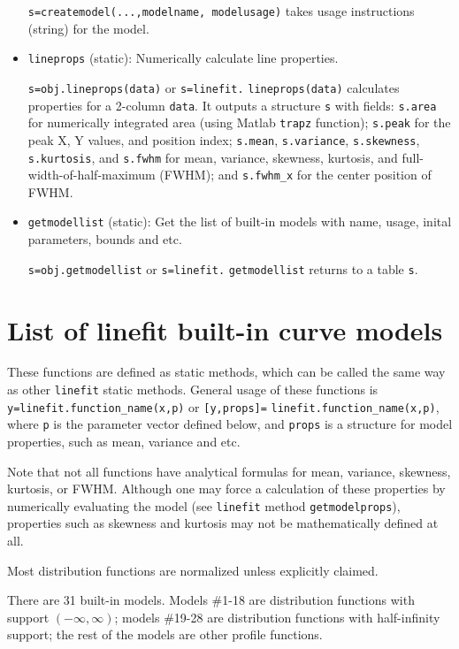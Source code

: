 \documentclass[reprint,showpacs,prb,nofootinbib,amsmath,amssymb]{revtex4-1}
\begin{document}
\begin{itemize}
\verb|s=createmodel(...,modelname, modelusage)| takes usage instructions (string) for the model.

\item \verb|lineprops| (static): Numerically calculate line properties.

\verb|s=obj.lineprops(data)| or \verb|s=linefit.| \verb|lineprops(data)| calculates properties for a 2-column \verb|data|. It outputs a structure \verb|s| with fields: \verb|s.area| for numerically integrated area (using Matlab \verb|trapz| function); \verb|s.peak| for the peak X, Y values, and position index; \verb|s.mean|, \verb|s.variance|, \verb|s.skewness|, \verb|s.kurtosis|, and \verb|s.fwhm| for mean, variance, skewness, kurtosis, and full-width-of-half-maximum (FWHM); and \verb|s.fwhm_x| for the center position of FWHM.

\item \verb|getmodellist| (static): Get the list of built-in models with name, usage, inital parameters, bounds and etc.

\verb|s=obj.getmodellist| or \verb|s=linefit.| \verb|getmodellist| returns to a table \verb|s|.

\end{itemize}

\section{List of \textbf{linefit} built-in curve models}\label{app:builtin}

These functions are defined as static methods, which can be called the same way as other \verb|linefit| static methods. General usage of these functions is \verb|y=linefit.function_name(x,p)| or \verb|[y,props]=| \verb|linefit.function_name(x,p)|, where \verb|p| is the parameter vector defined below, and \verb|props| is a structure for model properties, such as mean, variance and etc.

Note that not all functions have analytical formulas for mean, variance, skewness, kurtosis, or FWHM. Although one may force a calculation of these properties by numerically evaluating the model (see \verb|linefit| method \verb|getmodelprops|), properties such as skewness and kurtosis may not be mathematically defined at all.

Most distribution functions are normalized unless explicitly claimed.

There are 31 built-in models. Models \#1-18 are distribution functions with support $(-\infty,\infty)$; models \#19-28 are distribution functions with half-infinity support; the rest of the models are other profile functions.
\end{document}
